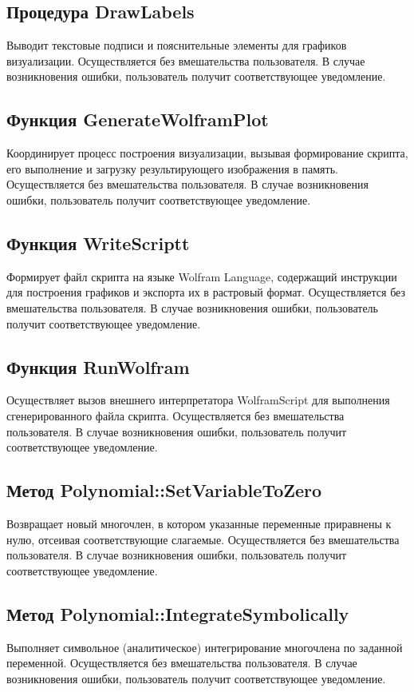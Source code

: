 \documentclass[14pt,a4paper,final]{extreport}
\begin{document}
\subsection{Процедура DrawLabels}
Выводит текстовые подписи и пояснительные элементы для графиков визуализации. Осуществляется без вмешательства пользователя. 
В случае возникновения ошибки, пользователь получит соответствующее уведомление.

\subsection{Функция GenerateWolframPlot}
Координирует процесс построения визуализации, вызывая формирование скрипта, его выполнение и загрузку результирующего изображения в память. Осуществляется без вмешательства пользователя. 
В случае возникновения ошибки, пользователь получит соответствующее уведомление.

\subsection{Функция WriteScriptt}
Формирует файл скрипта на языке Wolfram Language, содержащий инструкции для построения графиков и экспорта их в растровый формат. Осуществляется без вмешательства пользователя. 
В случае возникновения ошибки, пользователь получит соответствующее уведомление.

\subsection{Функция RunWolfram}
Осуществляет вызов внешнего интерпретатора WolframScript для выполнения сгенерированного файла скрипта. Осуществляется без вмешательства пользователя. 
В случае возникновения ошибки, пользователь получит соответствующее уведомление.

\subsection{Метод Polynomial::SetVariableToZero}
Возвращает новый многочлен, в котором указанные переменные приравнены к нулю, отсеивая соответствующие слагаемые. Осуществляется без вмешательства пользователя. 
В случае возникновения ошибки, пользователь получит соответствующее уведомление.

\subsection{Метод Polynomial::IntegrateSymbolically}
Выполняет символьное (аналитическое) интегрирование многочлена по заданной переменной. Осуществляется без вмешательства пользователя. 
В случае возникновения ошибки, пользователь получит соответствующее уведомление.
\end{document}

